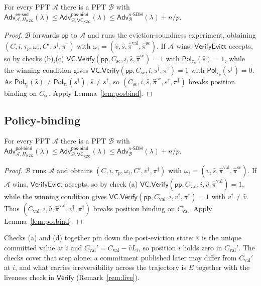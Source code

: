 \documentclass[version=submission]{iacrcc}
\theoremstyle{definition}
\newcommand{\secpar}{\lambda}
\newcommand{\PPT}{\mathrm{PPT}}
\newcommand{\Vfy}{\mathsf{Verify}}
\newcommand{\VfyEvict}{\mathsf{VerifyEvict}}
\newcommand{\pp}{\mathsf{pp}}
\newcommand{\Pol}{\mathsf{Pol}}
\newcommand{\Adv}{\mathsf{Adv}}
\newcommand{\Val}{\mathrm{val}}
\newcommand{\Sc}{\mathrm{sc}}
\newcommand{\Cval}{C_{\Val}}
\newcommand{\Csc}{C_{\Sc}}
\newcommand{\Evicted}{E}
\newcommand{\A}{\mathcal{A}}
\newcommand{\B}{\mathcal{B}}
\newcommand{\VC}{\mathsf{VC}}
\newcommand{\nsdh}{n\text{-}\mathsf{SDH}}
\newcommand{\posbind}{\mathsf{pos\text{-}bind}}
\newcommand{\evsnd}{\mathsf{ev\text{-}snd}}
\newcommand{\polbind}{\mathsf{pol\text{-}bind}}
\begin{document}
\begin{theorem}\label{thm:evsnd}
For every $\PPT$ $\A$ there is a $\PPT$ $\B$ with
$\Adv^{\evsnd}_{\A,\Pi_{\mathsf{KZG}}}(\secpar)\le
 \Adv^{\posbind}_{\B,\VC_{\mathsf{KZG}}}(\secpar)\le\Adv^{\nsdh}_{\B}(\secpar)+n/p$.
\end{theorem}
\begin{proof}
$\B$ forwards $\pp$ to $\A$ and runs the eviction-soundness experiment, obtaining
$(C,i,\tau_{\!p},\omega_i,C',s^{\dagger},\pi^{\dagger})$ with
$\omega_i=(\hat v,\hat s,\hat\pi^{\Val},\hat\pi^{\Sc})$. If $\A$ wins,
$\VfyEvict$ accepts, so by checks (b),(c)
$\VC.\Vfy(\pp,\Csc,i,\hat s,\hat\pi^{\Sc})=1$ with $\Pol_{\tau_{\!p}}(\hat s)=1$,
while the winning condition gives
$\VC.\Vfy(\pp,\Csc,i,s^{\dagger},\pi^{\dagger})=1$ with
$\Pol_{\tau_{\!p}}(s^{\dagger})=0$. As $\Pol_{\tau_{\!p}}(\hat s)\neq
\Pol_{\tau_{\!p}}(s^{\dagger})$, $\hat s\neq s^{\dagger}$, so
$(\Csc,i,\hat s,\hat\pi^{\Sc},s^{\dagger},\pi^{\dagger})$ breaks position binding
on $\Csc$. Apply Lemma~\ref{lem:posbind}.
\end{proof}

\subsection{Policy-binding}

\begin{theorem}\label{thm:polbind}
For every $\PPT$ $\A$ there is a $\PPT$ $\B$ with
$\Adv^{\polbind}_{\A,\Pi_{\mathsf{KZG}}}(\secpar)\le
 \Adv^{\posbind}_{\B,\VC_{\mathsf{KZG}}}(\secpar)\le\Adv^{\nsdh}_{\B}(\secpar)+n/p$.
\end{theorem}
\begin{proof}
$\B$ runs $\A$ and obtains
$(C,i,\tau_{\!p},\omega_i,C',v^{\dagger},\pi^{\dagger})$ with
$\omega_i=(\hat v,\hat s,\hat\pi^{\Val},\hat\pi^{\Sc})$. If $\A$ wins,
$\VfyEvict$ accepts, so by check (a)
$\VC.\Vfy(\pp,\Cval,i,\hat v,\hat\pi^{\Val})=1$, while the winning condition gives
$\VC.\Vfy(\pp,\Cval,i,v^{\dagger},\pi^{\dagger})=1$ with $v^{\dagger}\neq\hat v$.
Thus $(\Cval,i,\hat v,\hat\pi^{\Val},v^{\dagger},\pi^{\dagger})$ breaks position
binding on $\Cval$. Apply Lemma~\ref{lem:posbind}.
\end{proof}

\begin{remark}
Checks (a) and (d) together pin down the post-eviction state: $\hat v$ is the
unique committed value at $i$ and $\Cval'=\Cval-\hat v L_i$, so position $i$
holds zero in $\Cval'$. The checks cover that step alone; a commitment published
later may differ from $\Cval'$ at $i$, and what carries irreversibility across
the trajectory is $\Evicted$ together with the liveness check in $\Vfy$
(Remark~\ref{rem:live}).
\end{remark}
\end{document}
